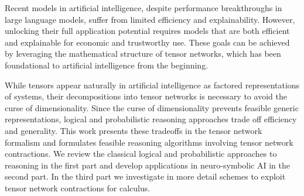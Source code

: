 Recent models in artificial intelligence, despite performance breakthroughs in large language models, suffer from limited efficiency and explainability.
However, unlocking their full application potential requires models that are both efficient and explainable for economic and trustworthy use.
These goals can be achieved by leveraging the mathematical structure of tensor networks, which has been foundational to artificial intelligence from the beginning.

While tensors appear naturally in artificial intelligence as factored representations of systems, their decompositions into tensor networks is necessary to avoid the curse of dimensionality. %
Since the curse of dimensionality prevents feasible generic representations, logical and probabilistic reasoning approaches trade off efficiency and generality.
This work presents these tradeoffs in the tensor network formalism and formulates feasible reasoning algorithms involving tensor network contractions.
We review the classical logical and probabilistic approaches to reasoning in the first part and develop applications in neuro-symbolic AI in the second part.
In the third part we investigate in more detail schemes to exploit tensor network contractions for calculus.